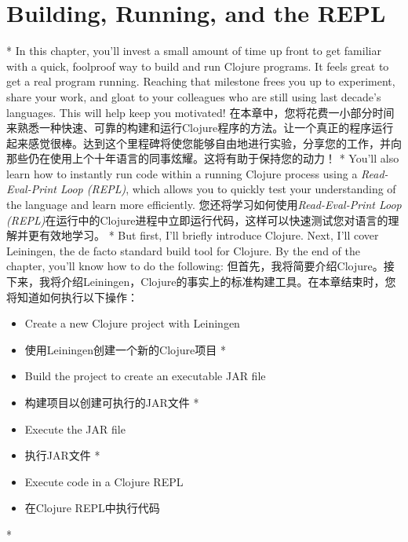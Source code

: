 
\chapter{Building, Running, and the REPL}
\begin{paracol}{2}
\switchcolumn[0]*
In this chapter, you'll invest a small amount of time up front to get
familiar with a quick, foolproof way to build and run Clojure programs.
It feels great to get a real program running. Reaching that milestone
frees you up to experiment, share your work, and gloat to your
colleagues who are still using last decade's languages. This will help
keep you motivated!
\switchcolumn
在本章中，您将花费一小部分时间来熟悉一种快速、可靠的构建和运行Clojure程序的方法。让一个真正的程序运行起来感觉很棒。达到这个里程碑将使您能够自由地进行实验，分享您的工作，并向那些仍在使用上个十年语言的同事炫耀。这将有助于保持您的动力！
\switchcolumn[0]*
You'll also learn how to instantly run code within a running Clojure
process using a \emph{Read-Eval-Print Loop (REPL)}, which allows you to
quickly test your understanding of the language and learn more
efficiently.
\switchcolumn
您还将学习如何使用\emph{Read-Eval-Print Loop (REPL)}在运行中的Clojure进程中立即运行代码，这样可以快速测试您对语言的理解并更有效地学习。
\switchcolumn[0]*
But first, I'll briefly introduce Clojure. Next, I'll cover Leiningen,
the de facto standard build tool for Clojure. By the end of the chapter,
you'll know how to do the following:
\switchcolumn
但首先，我将简要介绍Clojure。接下来，我将介绍Leiningen，Clojure的事实上的标准构建工具。在本章结束时，您将知道如何执行以下操作：

\begin{itemize}
\switchcolumn[0]*
\item Create a new Clojure project with Leiningen
\switchcolumn
\item 使用Leiningen创建一个新的Clojure项目
\switchcolumn[0]*
\item Build the project to create an executable JAR file
\switchcolumn
\item 构建项目以创建可执行的JAR文件
\switchcolumn[0]*
\item Execute the JAR file
\switchcolumn
\item 执行JAR文件
\switchcolumn[0]*
\item Execute code in a Clojure REPL
\switchcolumn
\item 在Clojure REPL中执行代码
\end{itemize}
\switchcolumn[0]*

\end{paracol}
